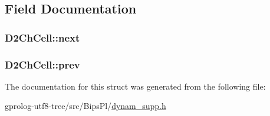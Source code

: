 \subsection{Field Documentation}
\subsubsection[{\texorpdfstring{next}{next}}]{ D2\+Ch\+Cell\+::next}\hypertarget{structD2ChCell_ab3eac88c8e41656c4dfa195b314fef5c}{}\label{structD2ChCell_ab3eac88c8e41656c4dfa195b314fef5c}
\subsubsection[{\texorpdfstring{prev}{prev}}]{ D2\+Ch\+Cell\+::prev}\hypertarget{structD2ChCell_a93c613b80554c6b885b8c680658475cf}{}\label{structD2ChCell_a93c613b80554c6b885b8c680658475cf}


The documentation for this struct was generated from the following file\+:\begin{DoxyCompactItemize}
\item 
gprolog-\/utf8-\/tree/src/\+Bips\+Pl/\hyperlink{dynam__supp_8h}{dynam\+\_\+supp.\+h}\end{DoxyCompactItemize}
